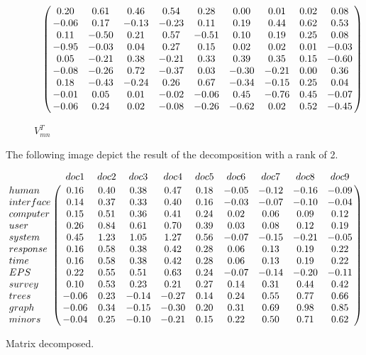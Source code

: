 \clearpage
\begin{figure}[h!]
	\begin{equation} \nonumber
	\bordermatrix{~  \cr	
		& 0.20 & 0.61 & 0.46 & 0.54 & 0.28 & 0.00 & 0.01 & 0.02 & 0.08 \cr
		& -0.06 & 0.17 & -0.13 & -0.23 & 0.11 & 0.19 & 0.44 & 0.62 & 0.53 \cr
		& 0.11 & -0.50 & 0.21 & 0.57 & -0.51 & 0.10 & 0.19 & 0.25 & 0.08 \cr
		& -0.95 & -0.03 & 0.04 & 0.27 & 0.15 & 0.02 & 0.02 & 0.01 & -0.03 \cr
		& 0.05 & -0.21 & 0.38 & -0.21 & 0.33 & 0.39 & 0.35 & 0.15 & -0.60 \cr
		& -0.08 & -0.26 & 0.72 & -0.37 & 0.03 & -0.30 & -0.21 & 0.00 & 0.36 \cr
		& 0.18 & -0.43 & -0.24 & 0.26 & 0.67 & -0.34 & -0.15 & 0.25 & 0.04 \cr
		& -0.01 & 0.05 & 0.01 & -0.02 & -0.06 & 0.45 & -0.76 & 0.45 & -0.07 \cr
		& -0.06 & 0.24 & 0.02 & -0.08 & -0.26 & -0.62 & 0.02 & 0.52 & -0.45 \cr	 
 }
	\end{equation}
	\caption{$V_{mn}^{T}$}
	\label{fig:TDM}
\end{figure}
The following image depict the result of the decomposition with a rank of 2.
\begin{table}[h!]
	\begin{equation} \nonumber
	\bordermatrix{~ & doc1 & doc2 & doc3 & doc4 & doc5 & doc6 & doc7 & doc8 & doc9 \cr	
		human 	& 0.16 & 0.40 & 0.38 & 0.47 & 0.18 & -0.05 & -0.12 & -0.16 & -0.09 \cr
		interface 	& 0.14 & 0.37 & 0.33 & 0.40 & 0.16 & -0.03 & -0.07 & -0.10 & -0.04 \cr
		computer	& 0.15 & 0.51 & 0.36 & 0.41 & 0.24 & 0.02 & 0.06 & 0.09 & 0.12 \cr
		user 		& 0.26 & 0.84 & 0.61 & 0.70 & 0.39 & 0.03 & 0.08 & 0.12 & 0.19 \cr
		system 	& 0.45 & 1.23 & 1.05 & 1.27 & 0.56 & -0.07 & -0.15 & -0.21 & -0.05 \cr
		response 	& 0.16 & 0.58 & 0.38 & 0.42 & 0.28 & 0.06 & 0.13 & 0.19 & 0.22 \cr
		time 		& 0.16 & 0.58 & 0.38 & 0.42 & 0.28 & 0.06 & 0.13 & 0.19 & 0.22 \cr
		EPS 	 	& 0.22 & 0.55 & 0.51 & 0.63 & 0.24 & -0.07 & -0.14 & -0.20 & -0.11 \cr 
		survey 	& 0.10 & 0.53 & 0.23 & 0.21 & 0.27 & 0.14 & 0.31 & 0.44 & 0.42 \cr
		trees 		& -0.06 & 0.23 & -0.14 & -0.27 & 0.14 & 0.24 & 0.55 & 0.77 & 0.66 \cr
		graph 		& -0.06 & 0.34 & -0.15 & -0.30 & 0.20 & 0.31 & 0.69 & 0.98 & 0.85 \cr
		minors 	& -0.04 & 0.25 & -0.10 & -0.21 & 0.15 & 0.22 & 0.50 & 0.71 & 0.62 \cr	  }
	\end{equation}
	\caption{Matrix decomposed.}
	\label{fig:TDM}
\end{table}
\clearpage

